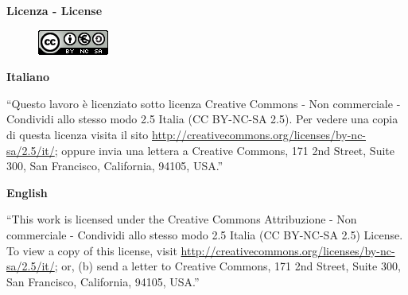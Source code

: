 
\begin{center}\textbf{{\large Licenza - License}}\end{center}

\begin{figure}[hcbp]  
  \centering
  \includegraphics{licenza/CreativeCommons/BY-NC-SA_2.5_IT/cc.png}
\end{figure}

\begin{center}\textbf{Italiano}\end{center}
“Questo lavoro è licenziato sotto licenza Creative Commons - Non commerciale - Condividi allo stesso modo 2.5 Italia (CC BY-NC-SA 2.5). Per vedere una copia di questa licenza visita il sito \url{http://creativecommons.org/licenses/by-nc-sa/2.5/it/}; oppure invia una lettera a Creative Commons, 171 2nd Street, Suite 300, San Francisco, California, 94105, USA.”\newline
\begin{center}\textbf{English}\end{center}
“This work is licensed under the Creative Commons Attribuzione - Non commerciale - Condividi allo stesso modo 2.5 Italia (CC BY-NC-SA 2.5) License. To view a copy of this license, visit \url{http://creativecommons.org/licenses/by-nc-sa/2.5/it/}; or, (b) send a letter to Creative Commons, 171 2nd Street, Suite 300, San Francisco, California, 94105, USA.” \newline
